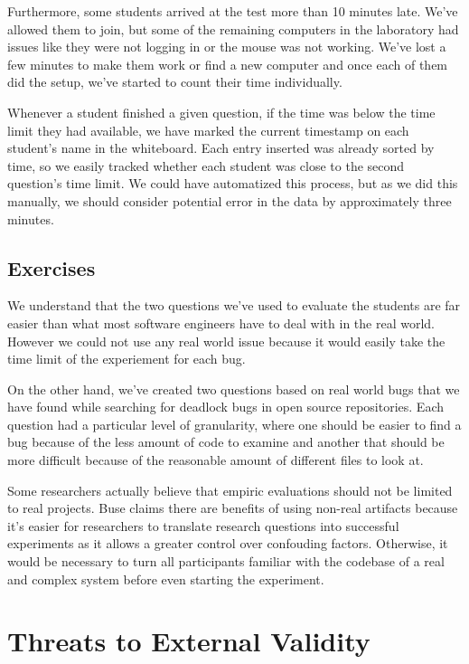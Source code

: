 Furthermore, some students arrived at the test more than 10 minutes late. We've allowed them to join, but some of the remaining computers in the laboratory had issues like they were not logging in or the mouse was not working. We've lost a few minutes to make them work or find a new computer and once each of them did the setup, we've started to count their time individually.

Whenever a student finished a given question, if the time was below the time limit they had available, we have marked the current timestamp on each student's name in the whiteboard. Each entry inserted was already sorted by time, so we easily tracked whether each student was close to the second question's time limit. We could have automatized this process, but as we did this manually, we should consider potential error in the data by approximately three minutes.

\subsection{Exercises}

We understand that the two questions we've used to evaluate the students are far easier than what most software engineers have to deal with in the real world. However we could not use any real world issue because it would easily take the time limit of the experiement for each bug.

On the other hand, we've created two questions based on real world bugs that we have found while searching for deadlock bugs in open source repositories. Each question had a particular level of granularity, where one should be easier to find a bug because of the less amount of code to examine and another that should be more difficult because of the reasonable amount of different files to look at.

Some researchers actually believe that empiric evaluations should not be limited to real projects. Buse claims there are benefits of using non-real artifacts \cite{buse} because it's easier for researchers to translate research questions into successful experiments as it allows a greater control over confouding factors. Otherwise, it would be necessary to turn all participants familiar with the codebase of a real and complex system before even starting the experiment. 

\section{Threats to External Validity}

